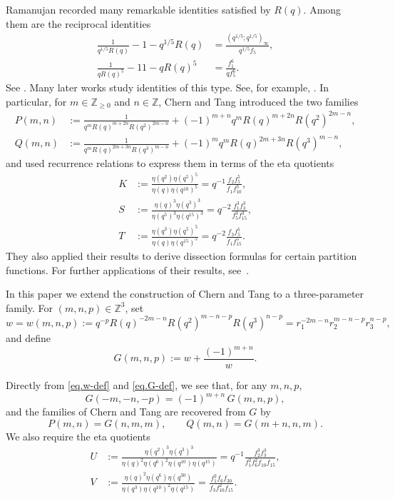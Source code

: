 \documentclass{amsart}
\theoremstyle{definition}
\begin{document}
Ramanujan recorded many remarkable identities satisfied by $R(q)$. Among
them are the reciprocal identities
\begin{align*}
\frac{1}{q^{1/5}R(q)}-1-q^{1/5}R(q)
&=\frac{(q^{1/5};q^{1/5})_\infty}{q^{1/5}f_5},\\
\frac{1}{qR(q)^5}-11-qR(q)^5
&=\frac{f_1^6}{qf_5^6}.
\end{align*}
See \cite[Sec.~7.4]{Berndt06}. Many later works study identities of this type. See, {for example},
\cite{Aygin,Baruah-Begum,CT2021,Gugg2012,HS}. In particular, for
$m\in\mathbb{Z}_{\geq 0}$ and $n\in\mathbb{Z}$, Chern and Tang
\cite{CT2021} introduced the two families
\begin{align*}
P(m,n)
&:=
\frac{1}{q^mR(q)^{m+2n}R(q^2)^{2m-n}}
+(-1)^{m+n}q^mR(q)^{m+2n}R(q^2)^{2m-n},\\
Q(m,n)
&:=
\frac{1}{q^mR(q)^{2m+3n}R(q^3)^{m-n}}
+(-1)^mq^mR(q)^{2m+3n}R(q^3)^{m-n},
\end{align*}
and used recurrence relations to express them in terms of the eta quotients
\begin{align*}
K&:=\frac{\eta(q^2)\eta(q^5)^5}
{\eta(q)\eta(q^{10})^5}
=q^{-1}\frac{f_2f_5^5}{f_1f_{10}^5},
\\
S&:=\frac{\eta(q)^3\eta(q^3)^3}
{\eta(q^5)^3\eta(q^{15})^3}
=q^{-2}\frac{f_1^3f_3^3}{f_5^3f_{15}^3},\\
T&:=\frac{\eta(q^3)\eta(q^5)^5}
{\eta(q)\eta(q^{15})^5}
=q^{-2}\frac{f_3f_5^5}{f_1f_{15}^5}.
\end{align*}
They also applied their results to derive dissection formulas for certain
partition functions. For further applications of their results, see~\cite{CLY,Gua2025,Tang25}.


In this paper we extend the construction of Chern and Tang to a
three-parameter family. For
$(m,n,p)\in\mathbb{Z}^3$, set
\begin{equation}
w=w(m,n,p):=
q^{-p}R(q)^{-2m-n}R(q^2)^{m-n-p}R(q^3)^{n-p}
=
r_1^{-2m-n}r_2^{m-n-p}r_3^{n-p},
\label{eq.w-def}
\end{equation}
and define
\begin{equation}
G(m,n,p):=w+\frac{(-1)^{m+n}}{w}.
\label{eq.G-def}
\end{equation}


Directly from \eqref{eq.w-def} and \eqref{eq.G-def}, {we see that, for any $m, n, p$,}
\begin{equation*}
G(-m,-n,-p)=(-1)^{m+n}\,G(m,n,p),
\end{equation*}
and the families of Chern and Tang are recovered from $G$ by
\begin{equation*}
P(m,n)=G(n,m,m),
\qquad
Q(m,n)=G(m+n,n,m).
\end{equation*}
We also require the eta quotients
\begin{align}
U&:=\frac{\eta(q^2)^3\eta(q^3)^3}
{\eta(q)^2\eta(q^6)^2\eta(q^{10})\eta(q^{15})}
=q^{-1}\frac{f_2^3f_3^3}{f_1^2f_6^2f_{10}f_{15}},
\label{eq.Udef}\\
V&:=\frac{\eta(q)^2\eta(q^6)\eta(q^{30})}
{\eta(q^3)\eta(q^{10})^2\eta(q^{15})}
=\frac{f_1^2f_6f_{30}}{f_3f_{10}^2f_{15}}.\label{eq.Vdef}
\end{align}
\end{document}
